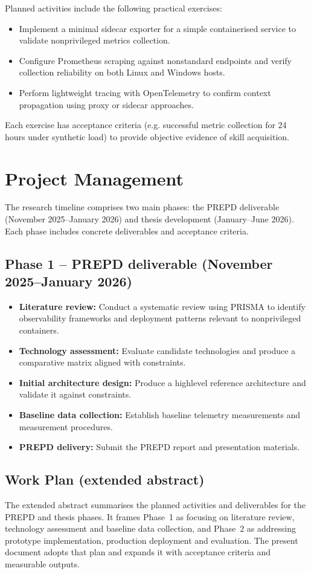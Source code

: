 Planned activities include the following practical exercises:
\begin{itemize}
    \item Implement a minimal sidecar exporter for a simple containerised service to validate non\-privileged metrics collection.
    \item Configure Prometheus scraping against non\-standard endpoints and verify collection reliability on both Linux and Windows hosts.
    \item Perform lightweight tracing with OpenTelemetry to confirm context propagation using proxy or sidecar approaches.
\end{itemize}
Each exercise has acceptance criteria (e.g. successful metric collection for 24 hours under synthetic load) to provide objective evidence of skill acquisition.

\section{Project Management}
The research timeline comprises two main phases: the PREPD deliverable (November 2025–January 2026) and thesis development (January–June 2026). Each phase includes concrete deliverables and acceptance criteria.

\subsection{Phase 1 -- PREPD deliverable (November 2025–January 2026)}
\begin{itemize}
    \item \textbf{Literature review:} Conduct a systematic review using PRISMA to identify observability frameworks and deployment patterns relevant to non\-privileged containers.
    \item \textbf{Technology assessment:} Evaluate candidate technologies and produce a comparative matrix aligned with constraints.
    \item \textbf{Initial architecture design:} Produce a high\-level reference architecture and validate it against constraints.
    \item \textbf{Baseline data collection:} Establish baseline telemetry measurements and measurement procedures.
    \item \textbf{PREPD delivery:} Submit the PREPD report and presentation materials.
\end{itemize}

\subsection{Work Plan (extended abstract)}
The extended abstract summarises the planned activities and deliverables for the PREPD and thesis phases. It frames Phase~1 as focusing on literature review, technology assessment and baseline data collection, and Phase~2 as addressing prototype implementation, production deployment and evaluation. The present document adopts that plan and expands it with acceptance criteria and measurable outputs.

